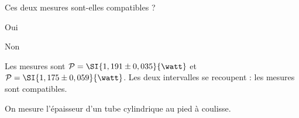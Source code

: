 

\begin{enonce}
Ces deux mesures sont-elles compatibles ?
   \begin{listeQCM2Colonnes}
     \item Oui
     \item Non
   \end{listeQCM2Colonnes}
   \smallskip
\end{enonce}

\reponse{\reponseA{}}

\begin{corrige}
  Les mesures sont \( \mathcal P = \SI{1,191\pm 0,035}{\watt} \) et \( \mathcal P =  \SI{1,175\pm0,059}{\watt} \). Les deux intervalles se recoupent : les mesures sont compatibles.
\end{corrige}


\finEntrainement







\hauteurLargeurCadreReponse		{6mm}{1.2cm}
\initialisationEntrainement

\debutEntrainement


On mesure l'épaisseur d'un tube cylindrique au pied à coulisse. 

